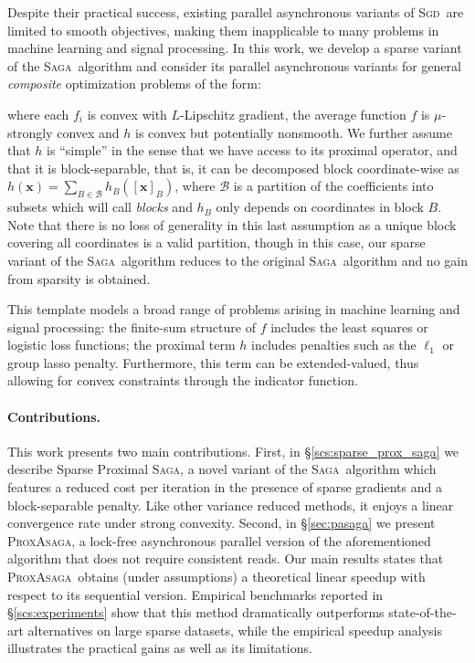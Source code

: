 \documentclass{article}
\def\RR{{\mathbb R}}
\newcommand*\mybluebox[1]{\colorbox{myblue}{\hspace{1em}#1\hspace{1em}}}
\newcommand{\PASAGA}{\textsc{ProxAsaga}}
\newcommand{\SAGA}{\textsc{Saga}}
\newcommand{\SGD}{\textsc{Sgd}}
\DeclareMathOperator*{\argmin}{arg\,min}
\def\xx{{\boldsymbol x}}
\renewcommand{\llbracket}{[}
\renewcommand{\rrbracket}{]}
\begin{document}
Despite their practical success, existing parallel asynchronous variants of \SGD\ are limited to smooth objectives, making them inapplicable to many problems in machine learning and signal processing.
In this work, we develop a sparse variant of the \SAGA\ algorithm and consider its parallel asynchronous variants for general \emph{composite} optimization problems of the form:
where each $f_i$ is convex with $L$-Lipschitz gradient, the average function $f$ is $\mu$-strongly convex and $h$ is convex but potentially nonsmooth.
We further assume that $h$ is ``simple'' in the sense that we have access to its proximal operator, and that it is
block-separable, that is, it can be decomposed block coordinate-wise as $h(\xx) = \textstyle{\sum_{B \in \mathcal{B}}} h_B(\llbracket\xx\rrbracket_B)$, where $$ is a partition of the coefficients into subsets which will call \emph{blocks} and $h_B$ only depends on coordinates in block $B$.  Note that there is no loss of generality in this last assumption as a unique block covering all coordinates is a valid partition, though in this case, our sparse variant of the \SAGA\ algorithm reduces to the original \SAGA\ algorithm and no gain from sparsity is obtained.



This template models a broad range of problems arising in machine learning and signal processing: the finite-sum structure of $f$ includes the least squares or logistic loss functions;
the proximal term $h$ includes penalties such as the $\ell_1$ or group lasso penalty.
Furthermore, this term can be extended-valued, thus allowing for convex constraints through the indicator function.

\paragraph{Contributions.} This work presents two main contributions. First, in \S\ref{scs:sparse_prox_saga} we describe Sparse Proximal \SAGA, a novel variant of the \SAGA\ algorithm which features a reduced cost per iteration in the presence of sparse gradients and a block-separable penalty.
Like other variance reduced methods, it enjoys a linear convergence rate under strong convexity.
Second, in \S\ref{sec:pasaga} we present \PASAGA, a lock-free asynchronous parallel version of the aforementioned algorithm that does not require consistent reads.
Our main results states that \PASAGA\ obtains (under assumptions) a theoretical linear speedup with respect to its sequential version.
Empirical benchmarks reported in \S\ref{scs:experiments} show that this method dramatically outperforms state-of-the-art alternatives on large sparse datasets, while the empirical speedup analysis illustrates the practical gains as well as its limitations.
\end{document}
